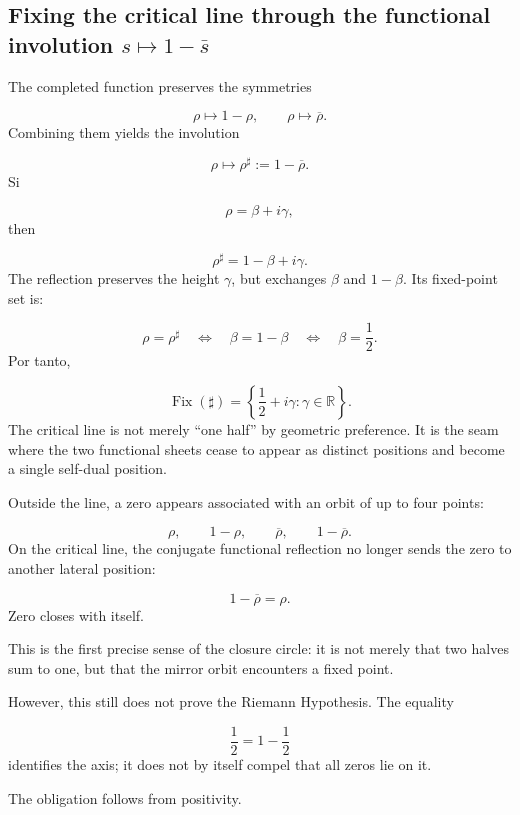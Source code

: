 \subsection{Fixing the critical line through the functional involution \(s\mapsto1-\bar s\)}
The completed function preserves the symmetries\par
\[
\rho\longmapsto1-\rho,
\qquad
\rho\longmapsto\overline\rho.
\]
Combining them yields the involution\par
\[
\rho\longmapsto\rho^\sharp
:=
1-\overline\rho.
\]
Si\par
\[
\rho=\beta+i\gamma,
\]
then\par
\[
\rho^\sharp
=
1-\beta+i\gamma.
\]
The reflection preserves the height \(\gamma\), but exchanges \(\beta\) and \(1-\beta\). Its fixed-point set is:\par
\[
\rho=\rho^\sharp
\quad\Longleftrightarrow\quad
\beta=1-\beta
\quad\Longleftrightarrow\quad
\beta=\frac12.
\]
Por tanto,\par
\[
\operatorname{Fix}(\sharp)
=
\left\{
\frac12+i\gamma:\gamma\in\mathbb R
\right\}.
\]
The critical line is not merely “one half” by geometric preference. It is the seam where the two functional sheets cease to appear as distinct positions and become a single self-dual position.\par
Outside the line, a zero appears associated with an orbit of up to four points:\par
\[
\rho,\qquad
1-\rho,\qquad
\overline\rho,\qquad
1-\overline\rho.
\]
On the critical line, the conjugate functional reflection no longer sends the zero to another lateral position:\par
\[
1-\overline\rho=\rho.
\]
Zero closes with itself.\par
This is the first precise sense of the closure circle: it is not merely
that two halves sum to one, but that the mirror orbit encounters a fixed
point.\par
However, this still does not prove the Riemann Hypothesis. The equality\par
\[
\frac12=1-\frac12
\]
identifies the axis; it does not by itself compel that all zeros lie on it.\par
The obligation follows from positivity.\par
{}
